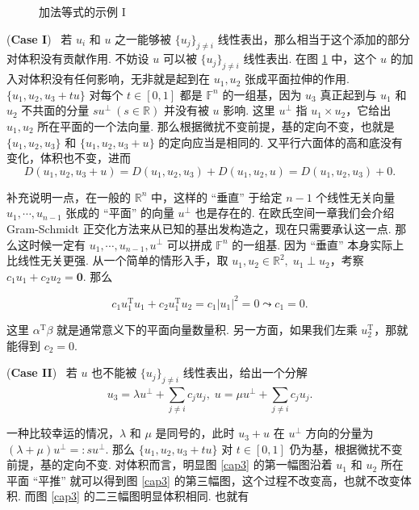 \documentclass[10pt,openany]{article}
\theoremstyle{thmstyle} %
\theoremstyle{defstyle} %
\theoremstyle{prostyle} %
\theoremstyle{exastyle}
\theoremstyle{remstyle}
\newcommand{\T}{^{\text{T}}}
\newcommand{\F}{\mathbb{F}}
\newcommand{\R}{\mathbb{R}}
\begin{document}
\begin{enumerate}[(i)]
\begin{figure}[htbp!]
\begin{minipage}{0.3\linewidth}
		\end{minipage}
		\caption{加法等式的示例 I}
		\label{cap2}
	\end{figure}
	
	
	(\textbf{Case I}) \ 若 \( u_i \) 和 \( u \) 之一能够被 \( \{u_j\}_{j \neq i} \) 线性表出，那么相当于这个添加的部分对体积没有贡献作用. 不妨设 \( u \) 可以被 \( \{u_j\}_{j \neq i} \) 线性表出. 在图 \ref{cap2} 中，这个 \( u \) 的加入对体积没有任何影响，无非就是起到在 \( u_1,u_2 \) 张成平面拉伸的作用.  \( \{ u_1,u_2,u_3+tu\} \) 对每个 \( t \in [0,1] \) 都是 \( \F^n \) 的一组基，因为 \( u_3 \) 真正起到与 \( u_1 \) 和 \( u_2 \) 不共面的分量 \( su^{\perp} \ (s \in \mathbb{R}) \) 并没有被 \( u \) 影响. 这里 \( u^{\perp} \) 指 \( u_1 \times u_2 \)，它给出 \( u_1, u_2 \) 所在平面的一个法向量. 那么根据微扰不变前提，基的定向不变，也就是 \( \{u_1,u_2,u_3\} \) 和 \( \{u_1,u_2,u_3+u\} \) 的定向应当是相同的. 又平行六面体的高和底没有变化，体积也不变，进而
	\[ D(u_1,u_2,u_3+u)=D(u_1,u_2,u_3)+D(u_1,u_2,u)=D(u_1,u_2,u_3)+0. \]
	
    补充说明一点，在一般的 \( \R^n \) 中，这样的 “垂直” 于给定 \( n-1 \) 个线性无关向量 \( u_1,\cdots,u_{n-1} \) 张成的 “平面” 的向量 \( u^{\perp} \) 也是存在的. 在欧氏空间一章我们会介绍 Gram-Schmidt 正交化方法来从已知的基出发构造之，现在只需要承认这一点. 那么这时候一定有 \( u_1,\cdots,u_{n-1},u^{\perp} \) 可以拼成 \( \F^n \) 的一组基. 因为 “垂直” 本身实际上比线性无关更强. 从一个简单的情形入手，取 \( u_1,u_2 \in \R^2, \; u_1 \perp u_2 \)，考察 \( c_1u_1+c_2u_2=\bm{0} \). 那么
    
    \[ c_1u_1\T u_1+c_2 u_1\T u_2= c_1 |u_1|^2= 0 \leadsto c_1=0. \]
    
    这里 \( \alpha\T \beta \) 就是通常意义下的平面向量数量积. 另一方面，如果我们左乘 \( u_2\T \)，那就能得到 \( c_2=0 \). 
	
	(\textbf{Case II}) \ 若 \( u \) 也不能被 \( \{u_j\}_{j \neq i} \) 线性表出，给出一个分解
	\[ u_3=\lambda u^{\perp}+ \sum_{j \neq i}^{} c_ju_j, \; u=\mu u^{\perp}+ \sum_{j \neq i}^{} c_ju_j. \]
	
	一种比较幸运的情况，\( \lambda \) 和 \( \mu \) 是同号的，此时 \( u_3+u \) 在 \( u^{\perp} \) 方向的分量为 \( (\lambda+\mu) u^{\perp}=:su^{\perp} \). 那么 \( \{ u_1,u_2,u_3+tu\} \) 对 \( t \in [0,1] \) 仍为基，根据微扰不变前提，基的定向不变. 对体积而言，明显图 \ref{cap3} 的第一幅图沿着 \( u_1 \) 和 \( u_2 \) 所在平面 “平推” 就可以得到图 \ref{cap3} 的第三幅图，这个过程不改变高，也就不改变体积. 而图 \ref{cap3} 的二三幅图明显体积相同. 也就有
	

\end{enumerate}
\end{document}
